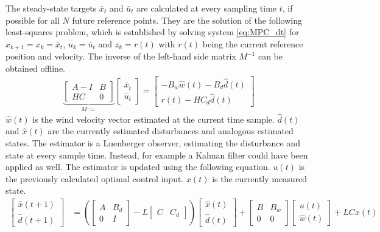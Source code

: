 The steady-state targets $\bar{x}_t$ and $\bar{u}_t$ are calculated at every sampling time $t$, if possible for all $N$ future reference points. They are the solution of the following least-squares problem, which is established by solving system \ref{eq:MPC_dt} for $x_{k+1}=x_k=\bar{x}_t$, $u_k = \bar{u}_t$ and $z_k = r(t)$ with $r(t)$ being the current reference position and velocity. The inverse of the left-hand side matrix $M^{-1}$ can be obtained offline.
\begin{align}
\underbrace{\begin{bmatrix}
A-I & B \\
HC & 0 
\end{bmatrix}}_{M:=}
\begin{bmatrix}
\bar{x}_t \\
\bar{u}_t
\end{bmatrix}
=
\begin{bmatrix}
-B_w \hat{w}(t) - B_d \hat{d}(t)\\
r(t) - H C_d \hat{d}(t) \label{eq:steady_state_ls}
\end{bmatrix}
\end{align}
$\hat{w}(t)$ is the wind velocity vector estimated at the current time sample. $\hat{d}(t)$ and $\hat x (t)$ are the currently estimated disturbances and analogous estimated states. The estimator is a Luenberger observer, estimating the disturbance and state at every sample time. Instead, for example a Kalman filter could have been applied as well. The estimator is updated using the following equation. $u(t)$ is the previously calculated optimal control input. $x(t)$ is the currently measured state.
\begin{align}
\begin{bmatrix}
\hat{x}(t+1) \\ \hat{d}(t+1)
\end{bmatrix}
&=\left(
\begin{bmatrix}
A & B_d \\
0 & I
\end{bmatrix}
- L
\begin{bmatrix}
C & C_d
\end{bmatrix}
\right) \begin{bmatrix}
\hat{x}(t) \\ \hat{d}(t)
\end{bmatrix}
+
\begin{bmatrix}
B & B_w \\
0 & 0
\end{bmatrix}
\begin{bmatrix}
u(t) \\ \hat{w}(t)
\end{bmatrix}
+
L C x(t) \label{eq:mpc_obsv_update}
\end{align}

